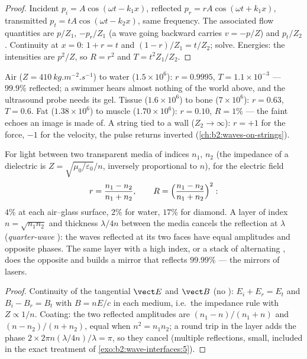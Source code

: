 \begin{proof}
Incident $p_i = A\cos(\omega t - k_1x)$, reflected $p_r = rA\cos(\omega t + k_1x)$,
transmitted $p_t = tA\cos(\omega t - k_2x)$, same frequency. The associated
flow quantities are $p/Z_1$, $-p_r/Z_1$ (a wave going backward carries
$v = -p/Z$) and $p_t/Z_2$. Continuity at $x = 0$: $1 + r = t$ and $(1 - r)/Z_1
= t/Z_2$; solve. Energies: the intensities are $p^2/Z$, so $R = r^2$ and
$T = t^2Z_1/Z_2$.
\end{proof}

\begin{example}\label{ex:b2:wave-interfaces:sound}
Air ($Z = \qty{410}{kg.m^{-2}.s^{-1}}$) to water ($1.5 \times 10^6$): $r = 0.9995$,
$T = 1.1 \times 10^{-3}$ --- $99.9\%$ reflected; a swimmer hears almost nothing
of the world above, and the ultrasound probe needs its gel. Tissue
($1.6 \times 10^6$) to bone ($7 \times 10^6$): $r = 0.63$, $T = 0.6$. Fat ($1.38 \times
10^6$) to muscle ($1.70 \times 10^6$): $r = 0.10$, $R = 1\%$ --- the faint echoes an
image is made of. A string tied to a wall ($Z_2 \to \infty$): $r = +1$ for the
force, $-1$ for the velocity, the pulse returns inverted
(\cref{ch:b2:waves-on-strings}).
\end{example}

\begin{proposition}\label{prop:b2:wave-interfaces:optics}
For light between two transparent media of indices $n_1$, $n_2$ (the
impedance of a dielectric is $Z = \sqrt{\mu_0/\varepsilon_0}/n$, inversely
proportional to $n$), for the electric field
\[
r = \frac{n_1 - n_2}{n_1 + n_2} , \qquad R = \Bigl(\frac{n_1 - n_2}{n_1 + n_2}\Bigr)^2 :
\]
$4\%$ at each air--glass surface, $2\%$ for water, $17\%$ for diamond. A
layer of index $n = \sqrt{n_1n_2}$ and thickness $\lambda/4n$ between the media
cancels the reflection at $\lambda$ (\emph{quarter-wave }): the waves reflected at its two faces have equal amplitudes
and opposite phases. The same layer with a high index, or a stack of
alternating , does the opposite and builds a
mirror that reflects $99.99\%$ --- the mirrors of lasers.
\end{proposition}

\begin{proof}
Continuity of the tangential $\vect E$ and $\vect B$ (no ): $E_i + E_r = E_t$ and $B_i - B_r = B_t$ with $B = nE/c$ in each
medium, i.e.\ the impedance rule with $Z \propto 1/n$. Coating: the two
reflected amplitudes are $(n_1 - n)/(n_1 + n)$ and $(n - n_2)/(n + n_2)$,
equal when $n^2 = n_1n_2$; a round trip in the layer adds the phase
$2\times2\pi n(\lambda/4n)/\lambda = \pi$, so they cancel (multiple reflections,
small, included in the exact treatment of \cref{exo:b2:wave-interfaces:5}).
\end{proof}

